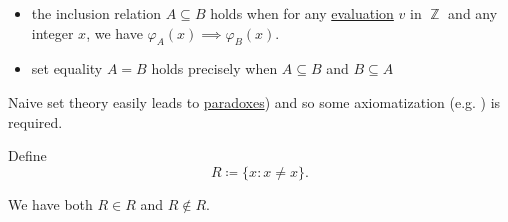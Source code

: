 \begin{definition}
\begin{itemize}
    \item the inclusion relation \( A \subseteq B \) holds when for any \hyperref[def:first_order_valuation/variable_assignment]{evaluation} \( v \) in \( \BbbZ \) and any integer \( x \), we have \( \varphi_A(x) \implies \varphi_B(x) \).

    \item set equality \( A = B \) holds precisely when \( A \subseteq B \) and \( B \subseteq A \)
  \end{itemize}

  Naive set theory easily leads to \hyperref[ex:russels_paradox_sets]{paradoxes}) and so some axiomatization (e.g. ) is required.
\end{definition}

\begin{example}\label{ex:russels_paradox_sets}
  Define
  \begin{equation*}
    R \coloneqq \{ x \colon x \neq x \}.
  \end{equation*}

  We have both \( R \in R \) and \( R \not\in R \).
\end{example}

